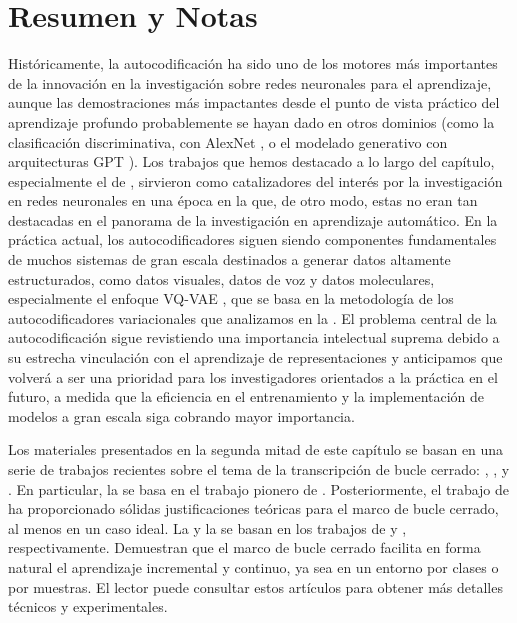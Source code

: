 \documentclass[../../book-main_es.tex]{subfiles}
\begin{document}
\section{Resumen y Notas}
Históricamente, la autocodificación ha sido uno de los motores más importantes de la innovación
en la investigación sobre redes neuronales para el aprendizaje, aunque las demostraciones más impactantes
desde el punto de vista práctico del aprendizaje profundo probablemente se hayan dado en otros dominios
(como la clasificación discriminativa, con AlexNet
\cite{krizhevsky2012imagenet}, o el modelado generativo con arquitecturas GPT
\cite{brown2020language}). 
Los trabajos que hemos destacado a lo largo del capítulo, especialmente el de
\cite{Hinton504}, sirvieron como catalizadores del interés por la investigación en redes neuronales
en una época en la que, de otro modo, estas no eran tan destacadas en el panorama de la investigación
en aprendizaje automático.
En la práctica actual, los autocodificadores siguen siendo componentes fundamentales de muchos sistemas de gran escala
destinados a generar datos altamente estructurados, como datos visuales, datos de voz
y datos moleculares, especialmente el enfoque VQ-VAE
\cite{van-den-Oord2017-jr}, que se basa en la metodología de los autocodificadores variacionales
que analizamos en la .
El problema central de la autocodificación sigue revistiendo una importancia intelectual suprema
debido a su estrecha vinculación con el aprendizaje de representaciones y anticipamos que
volverá a ser una prioridad para los investigadores orientados a la práctica en el futuro, a medida que
la eficiencia en el entrenamiento y la implementación de modelos a gran escala siga cobrando
mayor importancia.

Los materiales presentados en la segunda mitad de este capítulo se basan en una serie de
trabajos recientes sobre el tema de la transcripción de bucle cerrado: \cite{Dai-entropy-2022},
\cite{pai2022pursuit}, \cite{tong2023incremental} y
\cite{pmlr-v234-tong24a}. En particular, la
 se basa en el trabajo pionero
de \cite{Dai-entropy-2022}. Posteriormente, el trabajo de
\cite{pai2022pursuit} ha proporcionado sólidas justificaciones teóricas
para el marco de bucle cerrado, al menos en un caso ideal.
La  y
la  se basan en los trabajos de
\cite{tong2023incremental} y \cite{pmlr-v234-tong24a},
respectivamente. Demuestran que el marco de bucle cerrado
facilita en forma natural el aprendizaje incremental y continuo, ya sea en un
entorno por clases o por muestras. El lector puede consultar estos
artículos para obtener más detalles técnicos y experimentales.
\end{document}
